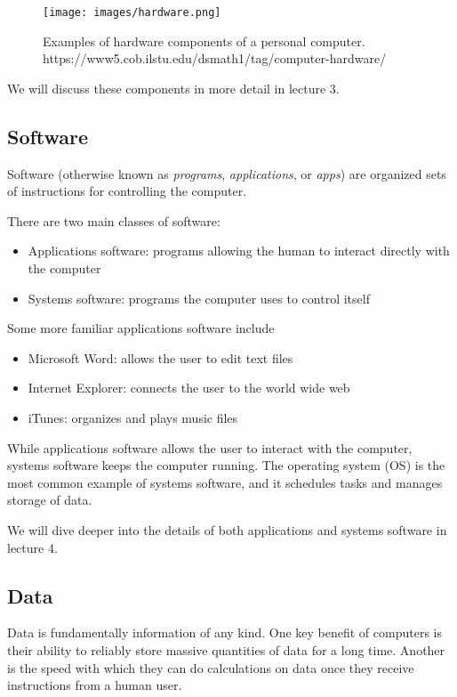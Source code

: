 \begin{figure}
	\centering
	\texttt{[image: images/hardware.png]}
	\caption{Examples of hardware components of a personal computer. https://www5.cob.ilstu.edu/dsmath1/tag/computer-hardware/}
	\label{fig:hardware}
\end{figure}

We will discuss these components in more detail in lecture 3.

\subsection{Software}

Software (otherwise known as \textit{programs}, \textit{applications}, or \textit{apps}) are organized sets of instructions for controlling the computer.

There are two main classes of software:

\begin{itemize}
	\item Applications software: programs allowing the human to interact directly with the computer
	\item Systems software: programs the computer uses to control itself
\end{itemize}

Some more familiar applications software include

\begin{itemize}
	\item Microsoft Word: allows the user to edit text files
	\item Internet Explorer: connects the user to the world wide web
	\item iTunes: organizes and plays music files
\end{itemize}

While applications software allows the user to interact with the computer, systems software keeps the computer running. The operating system (OS) is the most common example of systems software, and it schedules tasks and manages storage of data.

We will dive deeper into the details of both applications and systems software in lecture 4.

\subsection{Data}
Data is fundamentally information of any kind. One key benefit of computers is their ability to reliably store massive quantities of data for a long time. Another is the speed with which they can do calculations on data once they receive instructions from a human user.

